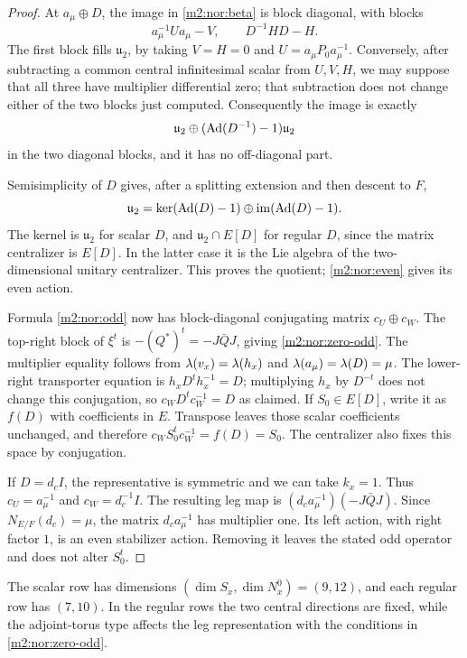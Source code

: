 \begin{proof}
At $a_\mu\oplus D$, the image in \eqref{m2:nor:beta} is block
diagonal, with blocks
\[
 a_\mu^{-1}Ua_\mu-V,
 \qquad D^{-1}HD-H.
\]
The first block fills $\mathfrak u_2$, by taking $V=H=0$ and
$U=a_\mu P_0a_\mu^{-1}$.  Conversely, after subtracting a common
central infinitesimal scalar from $U,V,H$, we may suppose that all
three have multiplier differential zero; that subtraction does
not change either of the two blocks just computed.  Consequently the image is exactly
\[
 \mathfrak u_2\oplus
 (\operatorname{Ad}(D^{-1})-1)\mathfrak u_2
\]
in the two diagonal blocks, and it has no off-diagonal part.

Semisimplicity of $D$ gives, after a splitting extension and then
descent to $F$,
\[
 \mathfrak u_2=
 \ker(\operatorname{Ad}(D)-1)\oplus\operatorname{im}(\operatorname{Ad}(D)-1).
\]
The kernel is $\mathfrak u_2$ for scalar $D$, and
$\mathfrak u_2\cap E[D]$ for regular $D$, since the matrix
centralizer is $E[D]$. In the latter case it is the Lie algebra of
the two-dimensional unitary centralizer. This proves the quotient;
\eqref{m2:nor:even} gives its even action.

Formula \eqref{m2:nor:odd} now has block-diagonal conjugating matrix
$c_U\oplus c_W$.  The top-right block of $\xi^t$ is
$-(Q^*)^t=-J\bar QJ$, giving \eqref{m2:nor:zero-odd}.
The multiplier equality follows from
$\lambda(v_x)=\lambda(h_x)$ and
$\lambda(a_\mu)=\lambda(D)=\mu$.  The lower-right transporter
equation is $h_xD^th_x^{-1}=D$; multiplying $h_x$ by $D^{-t}$
does not change this conjugation, so
$c_WD^tc_W^{-1}=D$ as claimed.  If $S_0\in E[D]$, write it
as $f(D)$ with coefficients in $E$.  Transpose leaves those scalar
coefficients unchanged, and therefore
$c_WS_0^tc_W^{-1}=f(D)=S_0$.  The centralizer also fixes this
space by conjugation.

If $D=d_cI$, the representative is symmetric and we can take
$k_x=1$.  Thus $c_U=a_\mu^{-1}$ and $c_W=d_c^{-1}I$.
The resulting leg map is $(d_ca_\mu^{-1})(-J\bar QJ)$.
Since $N_{E/F}(d_c)=\mu$, the matrix $d_ca_\mu^{-1}$ has
multiplier one.  Its left action, with right factor $1$, is an even
stabilizer action.  Removing it leaves the stated odd operator and
does not alter $S_0^t$.
\end{proof}

The scalar row has dimensions $(\dim S_x,\dim N_x^0)=(9,12)$,
and each regular row has $(7,10)$. In the regular rows the two
central directions are fixed, while the adjoint-torus type affects
the leg representation with the conditions in \eqref{m2:nor:zero-odd}.

